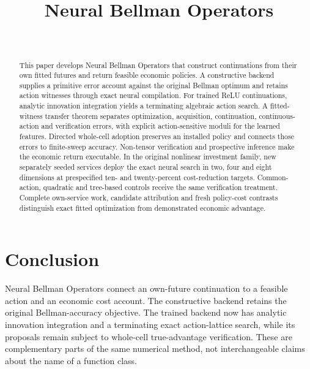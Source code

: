 \documentclass[ecta,nameyear,draft]{econsocart}
\begin{document}
\begin{frontmatter}
\title{Neural Bellman Operators}
\begin{aug}
\author[id=au1,addressref={add1}]{~}
\address[id=add1]{Peking University}
\end{aug}
\begin{abstract}
This paper develops Neural Bellman Operators that construct continuations from their own fitted futures and return feasible economic policies. A constructive backend supplies a primitive error account against the original Bellman optimum and retains action witnesses through exact neural compilation. For trained ReLU continuations, analytic innovation integration yields a terminating algebraic action search. A fitted-witness transfer theorem separates optimization, acquisition, continuation, continuous-action and verification errors, with explicit action-sensitive moduli for the learned features. Directed whole-cell adoption preserves an installed policy and connects those errors to finite-sweep accuracy. Non-tensor verification and prospective inference make the economic return executable. In the original nonlinear investment family, new separately seeded services deploy the exact neural search in two, four and eight dimensions at prespecified ten- and twenty-percent cost-reduction targets. Common-action, quadratic and tree-based controls receive the same verification treatment. Complete own-service work, candidate attribution and fresh policy-cost contrasts distinguish exact fitted optimization from demonstrated economic advantage.
\end{abstract}
\begin{keyword}
\end{keyword}
\end{frontmatter}












\section{Conclusion}\label{sec:conclusion56}
Neural Bellman Operators connect an own-future continuation to a feasible action and an economic cost account. The constructive backend retains the original Bellman-accuracy objective. The trained backend now has analytic innovation integration and a terminating exact action-lattice search, while its proposals remain subject to whole-cell true-advantage verification. These are complementary parts of the same numerical method, not interchangeable claims about the name of a function class.
\end{document}
